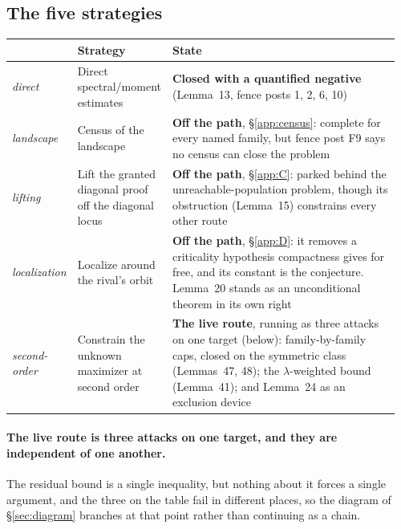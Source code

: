 \subsection{The five strategies}

\begin{center}
\begin{tabular}{@{}p{0.12\linewidth}p{0.24\linewidth}p{0.60\linewidth}@{}}
\toprule
& \textbf{Strategy} & \textbf{State} \\
\midrule
\emph{direct} & Direct spectral/moment estimates & \textbf{Closed with a quantified negative} (Lemma~13, fence posts 1, 2, 6, 10) \\
\emph{landscape} & Census of the landscape & \textbf{Off the path}, \S\ref{app:census}: complete for every named family, but fence post F9 says no census can close the problem \\
\emph{lifting} & Lift the granted diagonal proof off the diagonal locus & \textbf{Off the path}, \S\ref{app:C}: parked behind the unreachable-population problem, though its obstruction (Lemma~15) constrains every other route \\
\emph{localization} & Localize around the rival's orbit & \textbf{Off the path}, \S\ref{app:D}: it removes a criticality hypothesis compactness gives for free, and its constant is the conjecture. Lemma~20 stands as an unconditional theorem in its own right \\
\emph{second-order} & Constrain the unknown maximizer at second order & \textbf{The live route}, running as three attacks on one target (below): family-by-family caps, closed on the symmetric class (Lemmas~47, 48); the $\lambda$-weighted bound (Lemma~41); and Lemma~24 as an exclusion device \\
\bottomrule
\end{tabular}
\end{center}

\paragraph{The live route is three attacks on one target, and they are independent of one another.} The residual bound is a single inequality, but nothing about it forces a single argument, and the three on the table fail in different places, so the diagram of \S\ref{sec:diagram} branches at that point rather than continuing as a chain.

